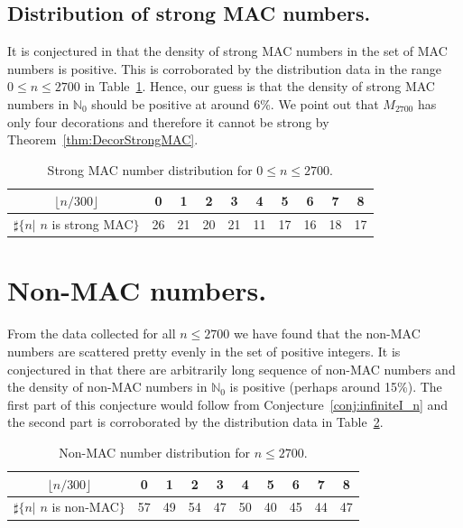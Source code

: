 \documentclass{article}
\theoremstyle{theorem}
\theoremstyle{definition}
\begin{document}
\subsection{Distribution of strong MAC numbers.}
It is conjectured in \cite[Conjecture 3, (8)]{Zhao2025Aug} that the density of strong MAC numbers in the set of MAC numbers is positive. This is corroborated by the distribution data in the range $0\le n\le 2700$ in Table~\ref{tbl:strongMACdistrution}. Hence, our guess is that the density of strong MAC numbers in ${\mathbb N}_0$ should be positive at around 6\%. We point out that $M_{2700}$ has only four decorations and therefore it cannot be strong by Theorem~\ref{thm:DecorStrongMAC}.

\begin{table}[h]
\caption{Strong MAC number distribution for $0\le n\le 2700$.}
\centering\begin{tabular}{|c|c|c|c|c|c|c|c|c|c|}
\hline
$\lfloor n/300 \rfloor$  &   0 &  1  & 2  & 3 & 4 & 5 & 6 & 7 & 8 \\
\hline
$\sharp\{n|$  $n$ is strong MAC$\}$ & 26& 21& 20& 21& 11& 17& 16& 18& 17  \\
\hline
\end{tabular}
\label{tbl:strongMACdistrution}
\end{table}


\section{Non-MAC numbers.}\label{sec:non-MAC}
From the data collected for all $n\le 2700$ we have found that the non-MAC numbers are scattered pretty evenly in the set of positive integers.
It is conjectured in \cite[Conjecture 3, (5) and (7)]{Zhao2025Aug} that there are arbitrarily long sequence of non-MAC numbers and the density of non-MAC numbers in ${\mathbb N}_0$ is positive (perhaps around 15\%). The first part of this conjecture would follow from Conjecture~\ref{conj:infiniteI_n} and the second part is corroborated by the distribution data in Table~\ref{tbl:nonMACdistrution}.

\begin{table}[h]
\caption{Non-MAC number distribution for $n\le 2700$.}
\centering\begin{tabular}{|c|c|c|c|c|c|c|c|c|c|}
\hline
$\lfloor n/300 \rfloor$  &   0 &  1  & 2  & 3 & 4 & 5 & 6 & 7 & 8 \\
\hline
$\sharp\{n|$  $n$ is non-MAC$\}$ & 57& 49& 54& 47& 50& 40& 45& 44& 47  \\
\hline
\end{tabular}
\label{tbl:nonMACdistrution}
\end{table}
\end{document}
